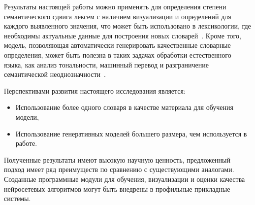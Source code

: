 \documentclass[LI,VKR]{HSEUniversity}
\begin{document}
Результаты настоящей работы можно применять для определения степени семантического сдвига лексем
с наличием визуализации и определений для каждого выявленного значения,
что может быть использовано в лексикологии,
где необходимы актуальные данные для построения новых словарей~\cite{DefinitionGenerationMainArticle}.
Кроме того, модель, позволяющая автоматически генерировать качественные словарные определения,
может быть полезна в таких задачах обработки естественного языка,
как анализ тональности, машинный перевод и разграничение семантической
неоднозначности~\cite{DefinitionModelingReviewAndDatasetAnalysis}.

Перспективами развития настоящего исследования является:
\begin{itemize}
    \item Использование более одного словаря в качестве материала для обучения модели,
    \item Использование генеративных моделей большего размера, чем используется в работе.
\end{itemize}

Полученные результаты имеют высокую научную ценность,
предложенный подход имеет ряд преимуществ по сравнению с существующими аналогами.
Созданные программные модули для обучения,
визуализации и оценки качества нейросетевых алгоритмов могут быть внедрены в профильные прикладные системы.

%

\printbibliography
\appendix

\end{document}
